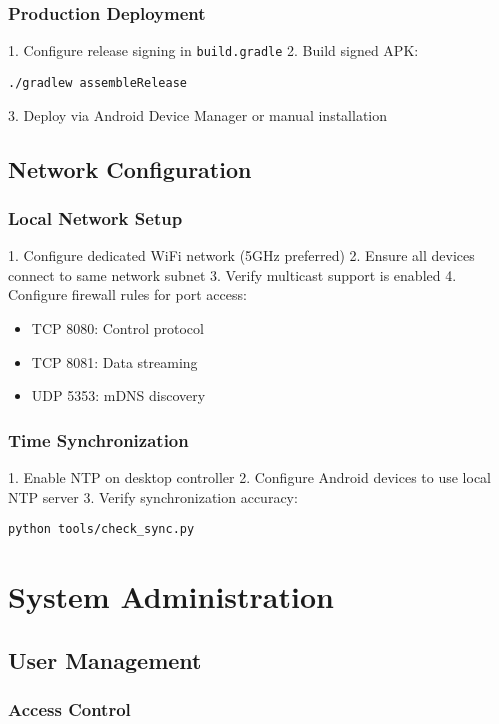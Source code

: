 \subsubsection{Production Deployment}

1. Configure release signing in \texttt{build.gradle}
2. Build signed APK:
\begin{verbatim}
./gradlew assembleRelease
\end{verbatim}
3. Deploy via Android Device Manager or manual installation

\subsection{Network Configuration}

\subsubsection{Local Network Setup}

1. Configure dedicated WiFi network (5GHz preferred)
2. Ensure all devices connect to same network subnet
3. Verify multicast support is enabled
4. Configure firewall rules for port access:
\begin{itemize}
\item TCP 8080: Control protocol
\item TCP 8081: Data streaming
\item UDP 5353: mDNS discovery
\end{itemize}

\subsubsection{Time Synchronization}

1. Enable NTP on desktop controller
2. Configure Android devices to use local NTP server
3. Verify synchronization accuracy:
\begin{verbatim}
python tools/check_sync.py
\end{verbatim}

\section{System Administration}

\subsection{User Management}

\subsubsection{Access Control}

